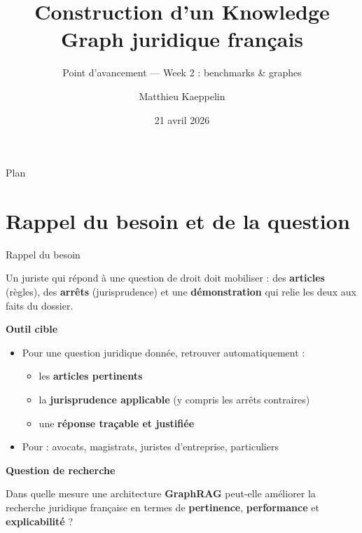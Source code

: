 \documentclass[aspectratio=169,10pt]{beamer}
\title[KG juridique FR --- Week 2]{Construction d'un Knowledge Graph juridique français}
\subtitle{Point d'avancement --- Week 2 : benchmarks \& graphes}
\author{Matthieu Kaeppelin}
\institute{Stage FE Recherche}
\date{21 avril 2026}
\newcommand{\keybox}[1]{%
  \begin{center}
  \colorbox{accentsoft}{\parbox{0.92\linewidth}{\centering #1}}
  \end{center}}
\begin{document}
\begin{frame}
  \titlepage
\end{frame}

\begin{frame}{Plan}
  \tableofcontents
\end{frame}

\section{Rappel du besoin et de la question}

\begin{frame}{Rappel du besoin}
  \keybox{\small Un juriste qui répond à une question de droit doit mobiliser : des \textbf{articles} (règles), des \textbf{arrêts} (jurisprudence) et une \textbf{démonstration} qui relie les deux aux faits du dossier.}

  \vspace{0.5em}
  \textbf{Outil cible}
  \begin{itemize}\footnotesize
    \item Pour une question juridique donnée, retrouver automatiquement :
    \begin{itemize}\footnotesize
      \item les \textbf{articles pertinents}
      \item la \textbf{jurisprudence applicable} (y compris les arrêts contraires)
      \item une \textbf{réponse traçable et justifiée}
    \end{itemize}
    \item Pour : avocats, magistrats, juristes d'entreprise, particuliers
  \end{itemize}

  \vspace{0.5em}
  \textbf{Question de recherche}
  \keybox{\small Dans quelle mesure une architecture \textbf{GraphRAG} peut-elle améliorer la recherche juridique française en termes de \textbf{pertinence}, \textbf{performance} et \textbf{explicabilité} ?}
\end{frame}
\end{document}

